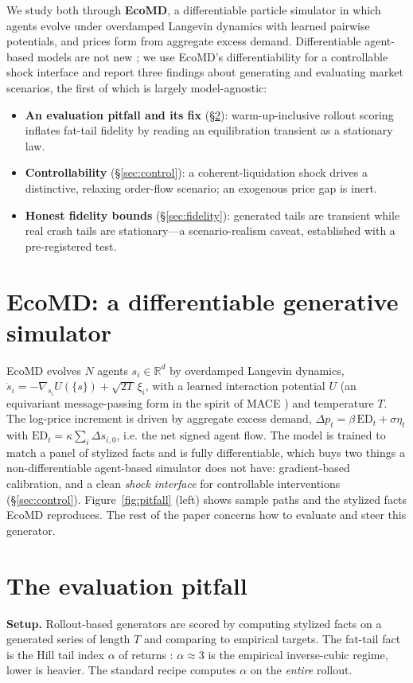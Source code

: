\documentclass{article}
\begin{document}
We study both through \textbf{EcoMD}, a differentiable particle simulator in which agents evolve under
overdamped Langevin dynamics with learned pairwise potentials, and prices form from aggregate excess
demand. Differentiable agent-based models are not new \citep{bouchaud1998,dyer2024,chopra2023}; we use
EcoMD's differentiability for a controllable shock interface and report three findings about generating
and evaluating market scenarios, the first of which is largely model-agnostic:
\begin{itemize}\setlength{\itemsep}{1pt}
  \item \textbf{An evaluation pitfall and its fix} (\S\ref{sec:pitfall}): warm-up-inclusive rollout
    scoring inflates fat-tail fidelity by reading an equilibration transient as a stationary law.
  \item \textbf{Controllability} (\S\ref{sec:control}): a coherent-liquidation shock drives a
    distinctive, relaxing order-flow scenario; an exogenous price gap is inert.
  \item \textbf{Honest fidelity bounds} (\S\ref{sec:fidelity}): generated tails are transient while
    real crash tails are stationary---a scenario-realism caveat, established with a pre-registered test.
\end{itemize}

\section{EcoMD: a differentiable generative simulator}\label{sec:ecomd}
EcoMD evolves $N$ agents $s_i \in \mathbb{R}^d$ by overdamped Langevin dynamics,
$\dot{s}_i = -\nabla_{s_i} U(\{s\}) + \sqrt{2T}\,\xi_i$, with a learned interaction potential $U$
(an equivariant message-passing form in the spirit of MACE \citep{batatia2022}) and temperature $T$.
The log-price increment is driven by aggregate excess demand,
$\Delta p_t = \beta\, \mathrm{ED}_t + \sigma\eta_t$ with $\mathrm{ED}_t = \kappa\sum_i \Delta s_{i,0}$,
i.e. the net signed agent flow. The model is trained to match a panel of stylized facts and is fully
differentiable, which buys two things a non-differentiable agent-based simulator
\citep{byrd2020abides} does not have: gradient-based calibration, and a clean \emph{shock interface}
for controllable interventions (\S\ref{sec:control}). Figure~\ref{fig:pitfall} (left) shows sample
paths and the stylized facts EcoMD reproduces. The rest of the paper concerns how to evaluate and
steer this generator.

\section{The evaluation pitfall}\label{sec:pitfall}
\textbf{Setup.} Rollout-based generators are scored by computing stylized facts on a generated series
of length $T$ and comparing to empirical targets. The fat-tail fact is the Hill tail index
$\alpha$ of returns \citep{hill1975}: $\alpha\!\approx\!3$ is the empirical inverse-cubic regime,
lower is heavier. The standard recipe computes $\alpha$ on the \emph{entire} rollout.
\end{document}
